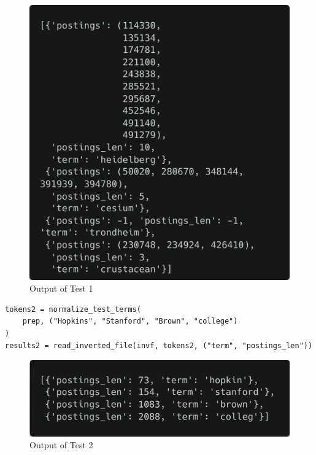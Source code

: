 \documentclass[11pt]{article}
\begin{document}
\begin{figure}[!ht]
    \centering
    \includegraphics[scale=0.15]{statics/test1.png}
    \caption{Output of Test 1}
\end{figure}
\clearpage
\newpage

\begin{lstlisting}[style=mypython,caption=Test 2: Document frequency for the words: "Hopkins"\, "Stanford"\, "Brown"\, and "college"]
tokens2 = normalize_test_terms(
    prep, ("Hopkins", "Stanford", "Brown", "college")
)
results2 = read_inverted_file(invf, tokens2, ("term", "postings_len"))
\end{lstlisting}

\begin{figure}[!ht]
    \centering
    \includegraphics[scale=0.15]{statics/test2.png}
    \caption{Output of Test 2}
\end{figure}
\end{document}
